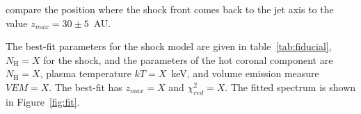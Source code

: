 compare the position where the shock front comes back to the jet axis to the value $z_{max} = 30\pm5$~AU.

The best-fit parameters for the shock model are given in table~\ref{tab:fiducial}, $N_\textrm{H}=X$ for the shock, and the parameters of the hot coronal component are $N_\textrm{H}=X$, plasma temperature $kT = X $~keV, and volume emission measure $VEM=X$. The best-fit has $z_{max} = X$ and $\chi^2_{red}= X$. The fitted spectrum is shown in Figure~\ref{fig:fit}.